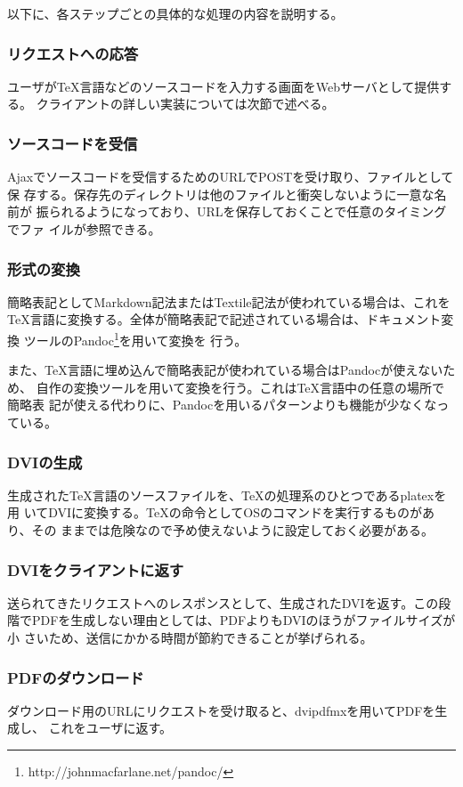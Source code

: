 \documentclass[a4j,9pt,titlepage]{jsarticle}
\begin{document}
以下に、各ステップごとの具体的な処理の内容を説明する。
\subsubsection{リクエストへの応答}
ユーザがTeX言語などのソースコードを入力する画面をWebサーバとして提供する。
クライアントの詳しい実装については次節で述べる。

\subsubsection{ソースコードを受信}
Ajaxでソースコードを受信するためのURLでPOSTを受け取り、ファイルとして保
存する。保存先のディレクトリは他のファイルと衝突しないように一意な名前が
振られるようになっており、URLを保存しておくことで任意のタイミングでファ
イルが参照できる。

\subsubsection{形式の変換}
簡略表記としてMarkdown記法またはTextile記法が使われている場合は、これを
TeX言語に変換する。全体が簡略表記で記述されている場合は、ドキュメント変換
ツールのPandoc\footnote{http://johnmacfarlane.net/pandoc/}を用いて変換を
行う。

また、TeX言語に埋め込んで簡略表記が使われている場合はPandocが使えないため、
自作の変換ツールを用いて変換を行う。これはTeX言語中の任意の場所で簡略表
記が使える代わりに、Pandocを用いるパターンよりも機能が少なくなっている。

\subsubsection{DVIの生成}
生成されたTeX言語のソースファイルを、TeXの処理系のひとつであるplatexを用
いてDVIに変換する。TeXの命令としてOSのコマンドを実行するものがあり、その
ままでは危険なので予め使えないように設定しておく必要がある。

\subsubsection{DVIをクライアントに返す}
送られてきたリクエストへのレスポンスとして、生成されたDVIを返す。この段
階でPDFを生成しない理由としては、PDFよりもDVIのほうがファイルサイズが小
さいため、送信にかかる時間が節約できることが挙げられる。

\subsubsection{PDFのダウンロード}
ダウンロード用のURLにリクエストを受け取ると、dvipdfmxを用いてPDFを生成し、
これをユーザに返す。
\end{document}
